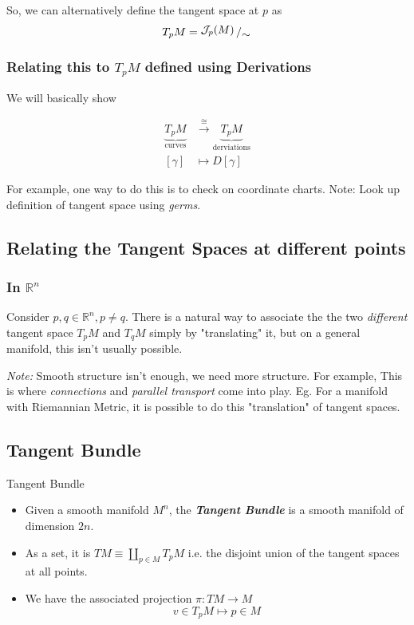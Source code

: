 \documentclass{article}
\newcommand{\R}{\mathbb{R}}
\newcommand{\bigslant}[2]{{\raisebox{.2em}{$#1$}\left/\raisebox{-.2em}{$#2$}\right.}}
\begin{document}
So, we can alternatively define the tangent space at $p$ as 
\[ T_pM = \bigslant{\mathcal{J}_p(M)}{\sim} \]

\vskip 0.5cm
\subsubsection*{Relating this to $T_pM$ defined using Derivations}

\vskip 0.5cm
We will basically show 

\begin{align*}
  \underbrace{T_pM}_{\text{curves}} &\xrightarrow{\cong}  \underbrace{T_pM}_{\text{derviations}} \\
  [\gamma] &\mapsto D[\gamma]
\end{align*}

For example, one way to do this is to check on coordinate charts.
\vskip 0.5cm
Note: Look up definition of tangent space using \emph{germs}.

\vskip 1cm
\subsection{Relating the Tangent Spaces at different points}

\vskip 0.5cm
\subsubsection*{In $\R^n$}
Consider $p, q \in \R^n, p \neq q$. There is a natural way to associate the the two \emph{different} tangent space $T_pM$ and $T_qM$ simply by "translating" it, but on a general manifold, this isn't usually possible.

\emph{Note:} Smooth structure isn't enough, we need more structure. For example, This is where \emph{connections} and \emph{parallel transport} come into play. Eg. For a manifold with Riemannian Metric, it is possible to do this "translation" of tangent spaces.


\vskip 1cm
\subsection{Tangent Bundle}

\vskip 0.5cm
\begin{mathdefinitionbox}{Tangent Bundle}
  \vskip 0.5cm
  \begin{itemize}
    \item  Given a smooth manifold $M^n$, the \emph{\textbf{Tangent Bundle}} is a smooth manifold of dimension $2n$.
    \item As a set, it is $TM \equiv \coprod_{p \in M} T_p M$ i.e. the disjoint union of the tangent spaces at all points.
    \item We have the associated projection $\pi : TM \rightarrow M$
    \[ v \in T_pM \mapsto p \in M \]
  \end{itemize}
\end{mathdefinitionbox}
\end{document}
